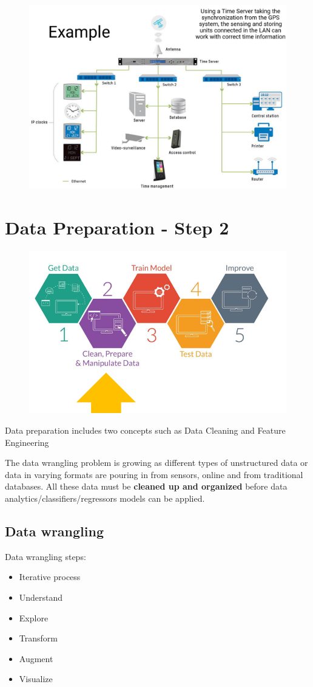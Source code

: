 \documentclass{report}
\begin{document}
\begin{figure}[H]
    \centering
    \includegraphics[width=0.8\linewidth]{images/sync.png}
\end{figure}


\section{Data Preparation - Step 2}
\begin{figure}[H]
    \centering
    \includegraphics[width=0.8\linewidth]{images/step2.png}
\end{figure}

\noindent Data preparation includes two concepts such as Data Cleaning and Feature Engineering

\noindent The data wrangling problem is growing as different types of unstructured data or data in varying formats are pouring in from sensors, online and from traditional databases. 
All these data must be \textbf{cleaned up and organized } before data analytics/classifiers/regressors models can be applied.

\subsection{Data wrangling}
\noindent Data wrangling steps:
\begin{itemize}
    \item Iterative process
    \item Understand
    \item Explore
    \item Transform
    \item Augment
    \item Visualize
\end{itemize}
\end{document}
